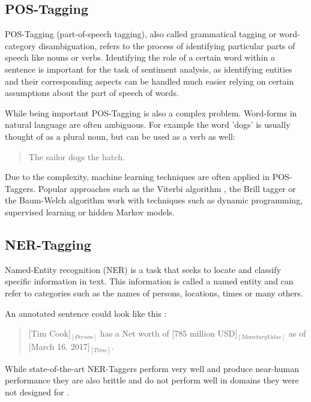 \documentclass[10pt,a4paper]{article}
\begin{document}
		\subsection{POS-Tagging}		
		POS-Tagging (part-of-speech tagging), also called grammatical tagging or word-category disambiguation, refers to the process of identifying particular parts of speech like nouns or verbs. Identifying the role of a certain word within a sentence is important for the task of sentiment analysis, as identifying entities and their corresponding aspects can be handled much easier relying on certain assumptions about the part of speech of words.
		
		While being important POS-Tagging is also a complex problem. Word-forms in natural language are often ambiguous. For example the word 'dogs' is usually thought of as a plural noun, but can be used as a verb as well:

		\begin{quote}
			The sailor dogs the hatch.
		\end{quote}

		Due to the complexity, machine learning techniques are often applied in POS-Taggers. Popular approaches such as the Viterbi algorithm \cite{Viterbi:2006:EBC:2263262.2267502}, the Brill tagger \cite{Brill:1992:SRP:974499.974526} or the Baum-Welch algorithm \cite{baumwelch} work with techniques such as dynamic programming, supervised learning or hidden Markov models.

		
		\subsection{NER-Tagging}
		
		Named-Entity recognition (NER) is a task that seeks to locate and classify specific information in text. This information is called a named entity and can refer to categories such as the names of persons, locations, times or many others.

		An annotated sentence could look like this :

		\begin{quote}
			[Tim Cook]$_{[Person]}$ has a Net worth of [785 million USD]$_{[Monetary Value]}$ as of [March 16. 2017]$_{[Time]}$.
		\end{quote}
		
		While state-of-the-art NER-Taggers perform very well and produce near-human performance they are also brittle and do not perform well in domains they were not designed for \cite{ner}.
		
\end{document}
